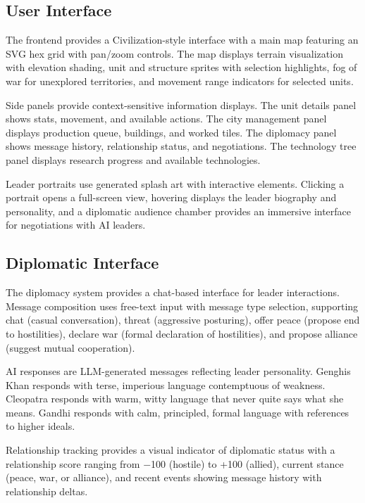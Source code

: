 \documentclass[conference]{IEEEtran}
\begin{document}
\subsection{User Interface}

The frontend provides a Civilization-style interface with a main map featuring an SVG hex grid with pan/zoom controls. The map displays terrain visualization with elevation shading, unit and structure sprites with selection highlights, fog of war for unexplored territories, and movement range indicators for selected units.

Side panels provide context-sensitive information displays. The unit details panel shows stats, movement, and available actions. The city management panel displays production queue, buildings, and worked tiles. The diplomacy panel shows message history, relationship status, and negotiations. The technology tree panel displays research progress and available technologies.

Leader portraits use generated splash art with interactive elements. Clicking a portrait opens a full-screen view, hovering displays the leader biography and personality, and a diplomatic audience chamber provides an immersive interface for negotiations with AI leaders.

\subsection{Diplomatic Interface}

The diplomacy system provides a chat-based interface for leader interactions. Message composition uses free-text input with message type selection, supporting chat (casual conversation), threat (aggressive posturing), offer peace (propose end to hostilities), declare war (formal declaration of hostilities), and propose alliance (suggest mutual cooperation).

AI responses are LLM-generated messages reflecting leader personality. Genghis Khan responds with terse, imperious language contemptuous of weakness. Cleopatra responds with warm, witty language that never quite says what she means. Gandhi responds with calm, principled, formal language with references to higher ideals.

Relationship tracking provides a visual indicator of diplomatic status with a relationship score ranging from $-$100 (hostile) to +100 (allied), current stance (peace, war, or alliance), and recent events showing message history with relationship deltas.
\end{document}
